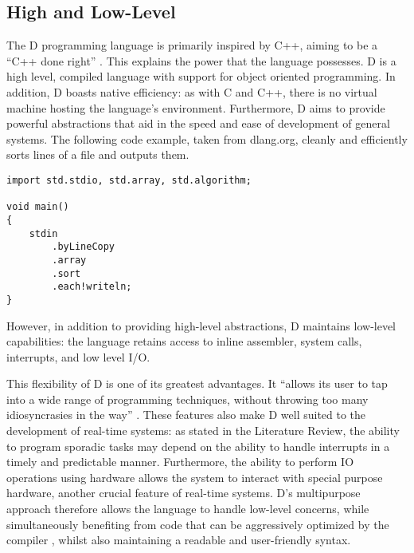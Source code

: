 \subsection{High and Low-Level}
The D programming language is primarily inspired by C++, aiming to be a ``C++ done
right'' 
\cite{qznc-tutorial}. 
This explains the power that the language possesses. D is a high level, compiled 
language with support for object oriented programming. In addition, D boasts 
native efficiency: as with C and C++, there is no virtual 
machine hosting the language's environment.
Furthermore, D aims to provide
powerful abstractions that aid in the speed and ease of development of general systems. 
The following code example, taken from dlang.org, cleanly and efficiently 
sorts lines of a file and outputs them. 
\begin{lstlisting}[basicstyle=\small]
import std.stdio, std.array, std.algorithm;

void main()
{
    stdin
        .byLineCopy
        .array
        .sort
        .each!writeln;
}
\end{lstlisting}
However, in addition to providing high-level abstractions, D maintains low-level 
capabilities: the language retains access to inline assembler, system calls, 
interrupts, and low level I/O.
\par\bigskip\noindent
This flexibility of D is one of its greatest advantages. It ``allows its user to tap 
into a wide range of programming techniques, without throwing too many 
idiosyncrasies in the way'' \cite{ddili-book}. 
These features also make D well suited to the development of real-time systems: 
as stated in the Literature Review, the ability to program sporadic tasks
may depend on the ability to handle interrupts in a timely and predictable manner.
Furthermore, the ability to perform IO operations using hardware allows the
system to interact with special purpose hardware, another crucial feature of
real-time systems.
D's multipurpose approach therefore allows the language to handle low-level concerns,
while simultaneously benefiting from code that can be aggressively optimized by the
compiler \cite{dlang-overview}, whilst also maintaining a readable and user-friendly
syntax.

